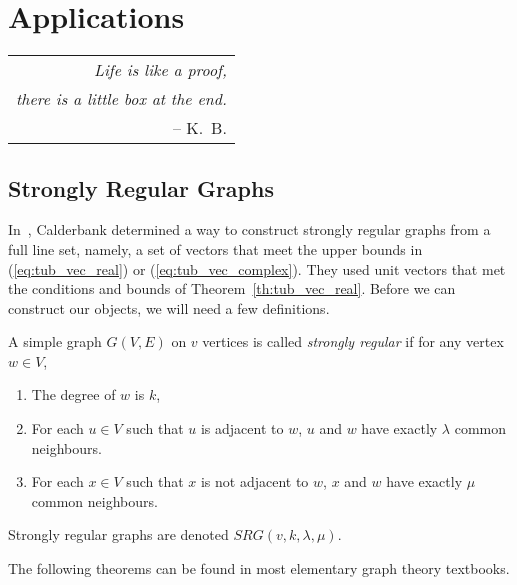 \chapter[Applications]{Applications}
\label{ch:app}

\hfill\begin{tabular}{r}\toprule
 {\it Life is like a proof,} \\ {\it there is a little box at the end.}\\
 -- K.~B.\\
\bottomrule\end{tabular}\vskip55pt

\section{Strongly Regular Graphs}

In~\cite{calderbank97}, Calderbank \etal determined a way to construct strongly regular graphs from a full line set, namely, a set of vectors that meet the upper bounds in (\ref{eq:tub_vec_real}) or (\ref{eq:tub_vec_complex}). They used unit vectors that met the conditions and bounds of Theorem~\ref{th:tub_vec_real}. Before we can construct our objects, we will need a few definitions.

\begin{definition} \label{def:srg}
 A simple graph $G(V,E)$ on $v$ vertices is called {\it strongly regular} if for any vertex $w \in V$,
 \begin{enumerate}
  \item The degree of $w$ is $k$,
  \item For each $u \in V$ such that $u$ is adjacent to $w$, $u$ and $w$ have exactly $\lambda$ common neighbours.
  \item For each $x \in V$ such that $x$ is not adjacent to $w$, $x$ and $w$ have exactly $\mu$ common neighbours.
 \end{enumerate}
 Strongly regular graphs are denoted $SRG(v,k,\lambda,\mu)$.
\end{definition}

The following theorems can be found in most elementary graph theory textbooks.

